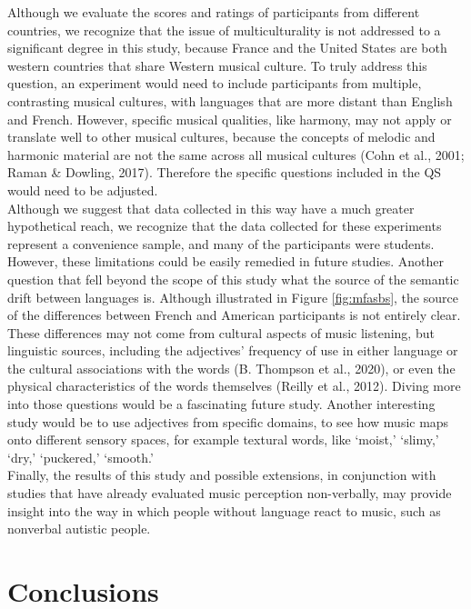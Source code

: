 \documentclass[
  english,
  man,floatsintext]{apa6}
\begin{document}
Although we evaluate the scores and ratings of participants from different countries, we recognize that the issue of multiculturality is not addressed to a significant degree in this study, because France and the United States are both western countries that share Western musical culture. To truly address this question, an experiment would need to include participants from multiple, contrasting musical cultures, with languages that are more distant than English and French. However, specific musical qualities, like harmony, may not apply or translate well to other musical cultures, because the concepts of melodic and harmonic material are not the same across all musical cultures (Cohn et al., 2001; Raman \& Dowling, 2017). Therefore the specific questions included in the QS would need to be adjusted.\\
Although we suggest that data collected in this way have a much greater hypothetical reach, we recognize that the data collected for these experiments represent a convenience sample, and many of the participants were students. However, these limitations could be easily remedied in future studies.
Another question that fell beyond the scope of this study what the source of the semantic drift between languages is. Although illustrated in Figure \ref{fig:mfasbs}, the source of the differences between French and American participants is not entirely clear. These differences may not come from cultural aspects of music listening, but linguistic sources, including the adjectives' frequency of use in either language or the cultural associations with the words (B. Thompson et al., 2020), or even the physical characteristics of the words themselves (Reilly et al., 2012). Diving more into those questions would be a fascinating future study. Another interesting study would be to use adjectives from specific domains, to see how music maps onto different sensory spaces, for example textural words, like `moist,' `slimy,' `dry,' `puckered,' `smooth.'\\
Finally, the results of this study and possible extensions, in conjunction with studies that have already evaluated music perception non-verbally, may provide insight into the way in which people without language react to music, such as nonverbal autistic people.

\hypertarget{conclusions}{%
\section{Conclusions}\label{conclusions}}
\end{document}
